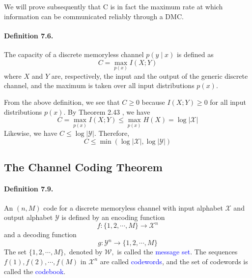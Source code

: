 \documentclass[8pt]{article}
\begin{document}
We will prove subsequently that C is in fact the maximum rate at which
information can be communicated reliably through a DMC.
\begin{tcolorbox}
	\paragraph{Definition 7.6.} The capacity of a discrete memoryless channel $p(y \mid x)$ is defined as
	$$
	C=\max _{p(x)} I(X ; Y)
	$$
	where $X$ and $Y$ are, respectively, the input and the output of the generic discrete channel, and the maximum is taken over all input distributions $p(x)$.
\end{tcolorbox}
From the above definition, we see that $C \geq 0$
because $I(X ; Y) \geq 0$ for all input distributions $p(x)$. By Theorem 2.43 , we have
$$
C=\max _{p(x)} I(X ; Y) \leq \max _{p(x)} H(X)=\log |\mathcal{X}|
$$
Likewise, we have $C \leq \log |\mathcal{Y}|$.
Therefore,
$$
C \leq \min (\log |\mathcal{X}|, \log |\mathcal{Y}|)
$$

\subsection{The Channel Coding Theorem}
\begin{tcolorbox}
	\paragraph{Definition 7.9.} An $(n, M)$ code for a discrete memoryless channel with input alphabet $\mathcal{X}$ and output alphabet $\mathcal{Y}$ is defined by an encoding function
	$$
	f:\{1,2, \cdots, M\} \rightarrow \mathcal{X}^{n}
	$$
	and a decoding function
	$$
	g: \mathcal{Y}^{n} \rightarrow\{1,2, \cdots, M\}
	$$
	The set $\{1,2, \cdots, M\},$ denoted by $ \mathcal{W},$ is called the \textcolor{blue}{message set}. The sequences $f(1), f(2), \cdots, f(M)$ in $\mathcal{X}^{n}$ are called \textcolor{blue}{codewords}, and the set of codewords is called the \textcolor{blue}{codebook}.
\end{tcolorbox}
\end{document}
